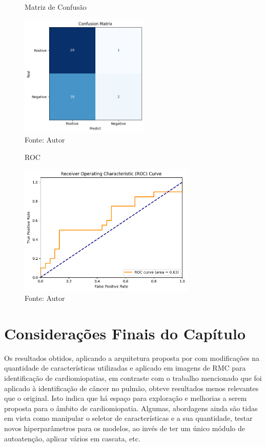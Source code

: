\begin{figure}[h!]
    \centering
    \caption{Matriz de Confusão}
    \includegraphics[width=0.55\textwidth]{figures/fig016.png}
    \caption*{Fonte: Autor}
    \label{fig:fig016}
\end{figure}

\begin{figure}[h!]
    \centering
    \caption{ROC}
    \includegraphics[width=0.75\textwidth]{figures/fig017.png}
    \caption*{Fonte: Autor}
    \label{fig:fig017}
\end{figure}

\section{Considerações Finais do Capítulo} 
\label{sec:cap6_consideracoes_finais}

Os resultados obtidos, aplicando a arquitetura proposta por  com modificações na quantidade de características utilizadas e aplicado em imagens de \gls{RMC} para identificação de cardiomiopatias, em contraste com o trabalho mencionado que foi aplicado à identificação de câncer no pulmão, obteve resultados menos relevantes que o original. Isto indica que há espaço para exploração e melhorias a serem proposta para o âmbito de cardiomiopatia. Algumas, abordagens ainda são tidas em vista como manipular o seletor de características e a sua quantidade, testar novos hiperparâmetros para os modelos, ao invés de ter um único módulo de autoatenção, aplicar vários em cascata, etc.

